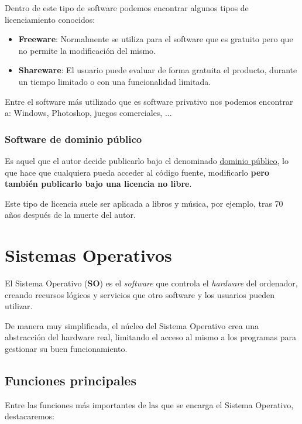 Dentro de este tipo de software podemos encontrar algunos tipos de licenciamiento conocidos:

\begin{itemize}
    \item \textbf{Freeware}: Normalmente se utiliza para el software que es gratuito pero que no permite la modificación del mismo.
    \item \textbf{Shareware}: El usuario puede evaluar de forma gratuita el producto, durante un tiempo limitado o con una funcionalidad limitada.
\end{itemize}

Entre el software más utilizado que es software privativo nos podemos encontrar a: Windows, Photoshop, juegos comerciales, ...

\subsection{Software de dominio público}
Es aquel que el autor decide publicarlo bajo el denominado \href{https://es.wikipedia.org/wiki/Dominio_p%C3%BAblico}{dominio público}, lo que hace que cualquiera pueda acceder al código fuente, modificarlo \textbf{pero también publicarlo bajo una licencia no libre}.

Este tipo de licencia suele ser aplicada a libros y música, por ejemplo, tras 70 años después de la muerte del autor.



\chapter{Sistemas Operativos}

El Sistema Operativo (\textbf{SO}) es el \textit{software} que controla el \textit{hardware} del ordenador, creando recursos lógicos y servicios que otro software y los usuarios pueden utilizar.

De manera muy simplificada, el núcleo del Sistema Operativo crea una abstracción del hardware real, limitando el acceso al mismo a los programas para gestionar su buen funcionamiento.

\section{Funciones principales}

Entre las funciones más importantes de las que se encarga el Sistema Operativo, destacaremos:


